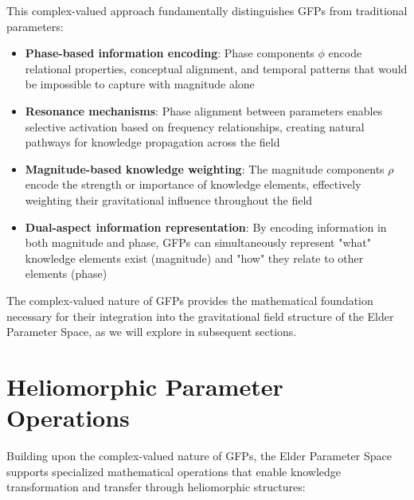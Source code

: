 This complex-valued approach fundamentally distinguishes GFPs from traditional parameters:
\begin{itemize}
    \item \textbf{Phase-based information encoding}: Phase components $\phi$ encode relational properties, conceptual alignment, and temporal patterns that would be impossible to capture with magnitude alone
    
    \item \textbf{Resonance mechanisms}: Phase alignment between parameters enables selective activation based on frequency relationships, creating natural pathways for knowledge propagation across the field
    
    \item \textbf{Magnitude-based knowledge weighting}: The magnitude components $\rho$ encode the strength or importance of knowledge elements, effectively weighting their gravitational influence throughout the field
    
    \item \textbf{Dual-aspect information representation}: By encoding information in both magnitude and phase, GFPs can simultaneously represent "what" knowledge elements exist (magnitude) and "how" they relate to other elements (phase)
\end{itemize}

The complex-valued nature of GFPs provides the mathematical foundation necessary for their integration into the gravitational field structure of the Elder Parameter Space, as we will explore in subsequent sections.

\section{Heliomorphic Parameter Operations}

Building upon the complex-valued nature of GFPs, the Elder Parameter Space supports specialized mathematical operations that enable knowledge transformation and transfer through heliomorphic structures:

